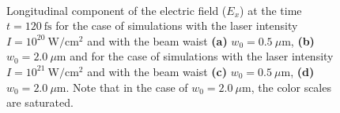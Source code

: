 \begin{figure}[h!]
	\centering
	\\[2mm]
	\caption{Longitudinal component of the electric field ($ E_{x} $) at the time $ t = 120 \ \mathrm{fs} $ for the case of simulations with the laser intensity $ I = 10^{20} \ \mathrm{W/cm^2} $ and with the beam waist \textbf{(a)} $ w_0 = 0.5 \ \mu\mathrm{m} $, \textbf{(b)} $ w_0 = 2.0 \ \mu\mathrm{m} $ and for the case of simulations with the laser intensity $ I = 10^{21} \ \mathrm{W/cm^2} $ and with the beam waist \textbf{(c)} $ w_0 = 0.5 \ \mu\mathrm{m} $, \textbf{(d)} $ w_0 = 2.0 \ \mu\mathrm{m} $. Note that in the case of $ w_0 = 2.0 \ \mu\mathrm{m} $, the color scales are saturated.}
	\label{fig:20}
\end{figure}

